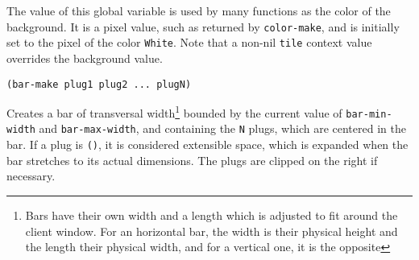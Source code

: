         

The value of this global variable is used by many functions as the color of
the background. It is a pixel value, such as returned by \verb"color-make",
and is initially set to the pixel of the color \verb"White".  Note that
a non-nil \verb"tile" context value overrides the background value.

        
{\usagefont\begin{verbatim}
(bar-make plug1 plug2 ... plugN)
\end{verbatim}}\usageupspace

Creates a bar of transversal width\footnote{Bars have their own width and a
length which is adjusted to fit around the client window. For an horizontal
bar, the width is their physical height and the length their physical width,
and for a vertical one, it is the opposite} bounded by the current value
of \verb"bar-min-width" and \verb"bar-max-width", and containing the {\tt N}
plugs, which are centered in the bar.  If a plug is \verb"()", it is
considered extensible space, which is expanded when the bar stretches to its
actual dimensions.  The plugs are clipped on the right if necessary.


